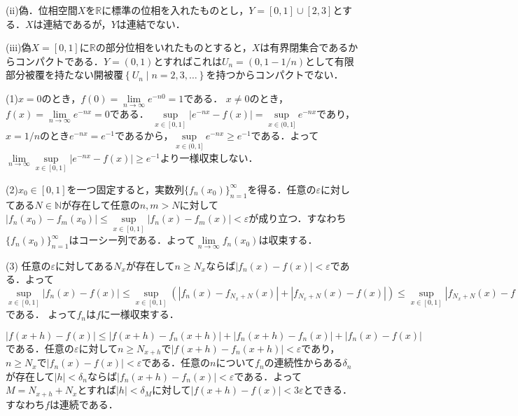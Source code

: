 \documentclass[
		book,
		head_space=20mm,
		foot_space=20mm,
		gutter=10mm,
		line_length=190mm
]{jlreq}
\begin{document}
(ii)偽．位相空間$X$を$\mathbb{R}$に標準の位相を入れたものとし，$Y=[0,1]\cup [2,3]$とする．$X$は連結であるが，$Y$は連結でない．

(iii)偽$X=[0,1]$に$\mathbb{R}$の部分位相をいれたものとすると，$X$は有界閉集合であるからコンパクトである．$Y=(0,1)$とすればこれは$U_n=(0,1-1/n)$として有限部分被覆を持たない開被覆$\left\{U_n\mid n=2,3,\dots\right\}$を持つからコンパクトでない．

(1)$x=0$のとき，$f(0)=\lim\limits_{n\to \infty} e^{-n0}=1$である．
$x\neq 0$のとき，$f(x)=\lim\limits_{n\to \infty} e^{-nx}=0$である．
$\sup\limits_{x\in [0,1]} |e^{-nx}-f(x)|= \sup\limits_{x\in (0,1]} e^{-nx}$であり，$x =1/n$のとき$e^{-nx}=e^{-1}$であるから，$\sup\limits_{x\in (0,1]} e^{-nx} \ge e^{-1}$である．よって$\lim\limits_{n\to \infty} \sup\limits_{x\in [0,1]} |e^{-nx}-f(x)| \ge e^{-1}$より一様収束しない．

(2)$x_0\in [0,1]$を一つ固定すると，実数列$\{ f_n(x_0) \}_{n=1}^{\infty}$を得る．任意の$\varepsilon$に対してある$N \in \mathbb{N}$が存在して任意の$n,m > N$に対して$ |f_n(x_0)-f_m(x_0)|\le \sup\limits_{x\in [0,1]} |f_n(x)-f_m(x)| <\varepsilon$が成り立つ．すなわち$\{ f_n(x_0) \}_{n=1}^{\infty}$はコーシー列である．よって$\lim\limits_{n\to \infty} f_n(x_0)$は収束する．

(3) 任意の$\varepsilon$に対してある$N_x$が存在して$n\ge N_x$ならば$|f_n(x)-f(x)|<\varepsilon$である．よって
$\sup\limits_{x\in [0,1]} |f_n(x)-f(x)| \le \sup\limits_{x\in [0,1]}( |f_n(x)-f_{N_x+N}(x)| +|f_{N_x+N}(x)-f(x)| )\le \sup\limits_{x\in [0,1]} |f_{N_x+N}(x)-f(x)| +\varepsilon<2\varepsilon\quad(n > N)$である．
よって$f_n$は$f$に一様収束する．

$|f(x+h)-f(x)| \le |f(x+h)-f_n(x+h)|+|f_n(x+h)-f_n(x)|+|f_n(x)-f(x)|$である．任意の$\varepsilon$に対して$n\ge N_{x+h}$で$|f(x+h)-f_n(x+h)|<\varepsilon$であり，$n\ge N_x$で$|f_n(x)-f(x)|<\varepsilon$である．任意の$n$について$f_n$の連続性からある$\delta_n$が存在して$|h|<\delta_n$ならば$|f_n(x+h)-f_n(x)|<\varepsilon$である．よって$M=N_{x+h}+N_x$とすれば$|h|<\delta_M$に対して$|f(x+h)-f(x)|< 3\varepsilon$とできる．すなわち$f$は連続である．
\end{document}
